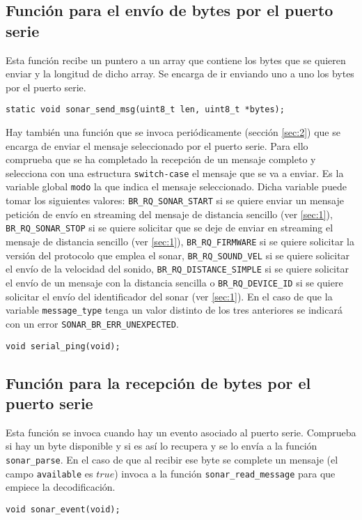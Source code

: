 \subsection{Función para el envío de bytes por el puerto serie}

Esta función recibe un puntero a un array que contiene los bytes que se quieren enviar y la longitud de dicho array. Se encarga de ir enviando uno a uno los bytes por el puerto serie.
			\begin{lstlisting}[style=C]
static void sonar_send_msg(uint8_t len, uint8_t *bytes);
\end{lstlisting}

Hay también una función que se invoca periódicamente (sección \ref{sec:2}) que se encarga de enviar el mensaje seleccionado por el puerto serie. Para ello comprueba que se ha completado la recepción de un mensaje completo y selecciona con una estructura \texttt{switch-case} el mensaje que se va a enviar. Es la variable global \texttt{modo} la que indica el mensaje seleccionado. Dicha variable puede tomar los siguientes valores: \texttt{BR\_RQ\_SONAR\_START} si se quiere enviar un mensaje petición de envío en streaming del mensaje de distancia sencillo (ver \ref{sec:1}), \texttt{BR\_RQ\_SONAR\_STOP} si se quiere solicitar que se deje de enviar en streaming el mensaje de distancia sencillo (ver \ref{sec:1}), \texttt{BR\_RQ\_FIRMWARE} si se quiere solicitar la versión del protocolo que emplea el sonar, \texttt{BR\_RQ\_SOUND\_VEL} si se quiere solicitar el envío de la velocidad del sonido, \texttt{BR\_RQ\_DISTANCE\_SIMPLE} si se quiere solicitar el envío de un mensaje con la distancia sencilla o \texttt{BR\_RQ\_DEVICE\_ID} si se quiere solicitar el envío del identificador del sonar (ver \ref{sec:1}). En el caso de que la variable \texttt{message\_type} tenga un valor distinto de los tres anteriores se indicará con un error \texttt{SONAR\_BR\_ERR\_UNEXPECTED}. 


\begin{lstlisting}[style=C]
void serial_ping(void);
\end{lstlisting}

\subsection{Función para la recepción de bytes por el puerto serie}

Esta función se invoca cuando hay un evento asociado al puerto serie. Comprueba si hay un byte disponible y si es así lo recupera y se lo envía a la función \texttt{sonar\_parse}. En el caso de que al recibir ese byte se complete un mensaje (el campo \texttt{available} es $true$) invoca a la función \texttt{sonar\_read\_message} para que empiece la decodificación.
			\begin{lstlisting}[style=C]
void sonar_event(void);
\end{lstlisting}


